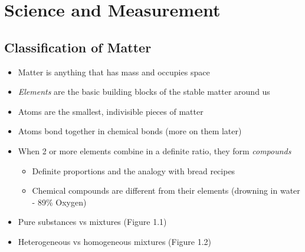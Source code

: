 \documentclass[12pt, openany, letterpaper]{memoir}
\begin{document}
\chapter{Science and Measurement}
\section{Classification of Matter}
\begin{itemize}
	\item Matter is anything that has mass and occupies space
	\item \emph{Elements} are the basic building blocks of the stable matter around us
	\item Atoms are the smallest, indivisible pieces of matter
	\item Atoms bond together in chemical bonds (more on them later)
	\item When 2 or more elements combine in a definite ratio, they form \emph{compounds}
	\begin{itemize}
		\item Definite proportions and the analogy with bread recipes
		\item Chemical compounds are different from their elements (drowning in water - 89\% Oxygen)
	\end{itemize}	
	\item Pure substances vs mixtures (Figure 1.1)
	\item Heterogeneous vs homogeneous mixtures (Figure 1.2)
\end{itemize}
\end{document}
